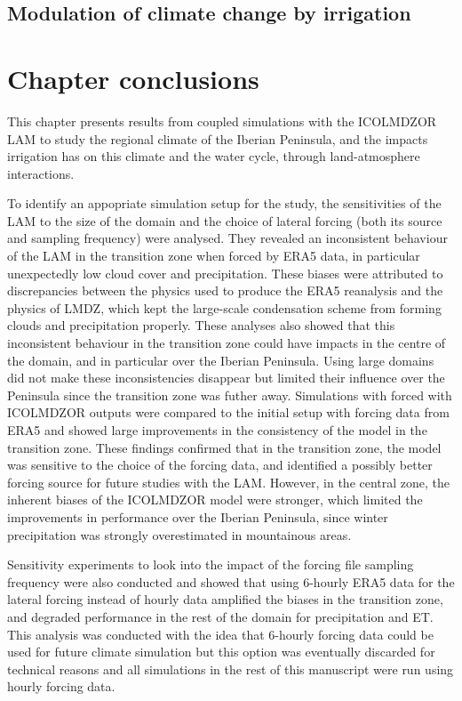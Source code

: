 \subsection{Modulation of climate change by irrigation}
\clearpage

\section{Chapter conclusions}

This chapter presents results from coupled simulations with the ICOLMDZOR LAM to study the regional climate of the Iberian Peninsula, and the impacts irrigation has on this climate and the water cycle, through land-atmosphere interactions. 

To identify an appopriate simulation setup for the study, the sensitivities of the LAM to the size of the domain and the choice of lateral forcing (both its source and sampling frequency) were analysed. They revealed an inconsistent behaviour of the LAM in the transition zone when forced by ERA5 data, in particular unexpectedly low cloud cover and precipitation. These biases were attributed to discrepancies between the physics used to produce the ERA5 reanalysis and the physics of LMDZ, which kept the large-scale condensation scheme from forming clouds and precipitation properly.
These analyses also showed that this inconsistent behaviour in the transition zone could have impacts in the centre of the domain, and in particular over the Iberian Peninsula. Using large domains did not make these inconsistencies disappear but limited their influence over the Peninsula since the transition zone was futher away.
Simulations with forced with ICOLMDZOR outputs were compared to the initial setup with forcing data from ERA5 and showed large improvements in the consistency of the model in the transition zone. These findings confirmed that in the transition zone, the model was sensitive to the choice of the forcing data, and identified a possibly better forcing source for future studies with the LAM. However, in the central zone, the inherent biases of the ICOLMDZOR model were stronger, which limited the improvements in performance over the Iberian Peninsula, since winter precipitation was strongly overestimated in mountainous areas.

Sensitivity experiments to look into the impact of the forcing file sampling frequency were also conducted and showed that using 6-hourly ERA5 data for the lateral forcing instead of hourly data amplified the biases in the transition zone, and degraded performance in the rest of the domain for precipitation and ET. This analysis was conducted with the idea that 6-hourly forcing data could be used for future climate simulation but this option was eventually discarded for technical reasons and all simulations in the rest of this manuscript were run using hourly forcing data.


